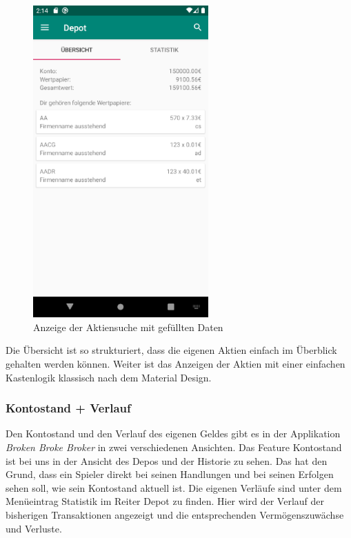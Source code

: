 \documentclass[10pt]{scrartcl}
\begin{document}
\begin{figure}[H]
	\centering
	\includegraphics[width=0.6\textwidth]{Bilder/Prsi/depot.png}
	\caption{Anzeige der Aktiensuche mit gefüllten Daten}
\end{figure}
 
Die Übersicht ist so strukturiert, dass die eigenen Aktien einfach im Überblick gehalten werden können. Weiter ist das Anzeigen der Aktien mit einer einfachen Kastenlogik klassisch nach dem Material Design.

\subsubsection{Kontostand + Verlauf}

Den Kontostand und den Verlauf des eigenen Geldes gibt es in der Applikation \textit{Broken Broke Broker} in zwei verschiedenen Ansichten. Das Feature Kontostand ist bei uns in der Ansicht des Depos und der Historie zu sehen. Das hat den Grund, dass ein Spieler direkt bei seinen Handlungen und bei seinen Erfolgen sehen soll, wie sein Kontostand aktuell ist. Die eigenen Verläufe sind unter dem Menüeintrag Statistik im Reiter Depot zu finden. Hier wird der Verlauf der bisherigen Transaktionen angezeigt und die entsprechenden Vermögenszuwächse und Verluste. 
\end{document}
